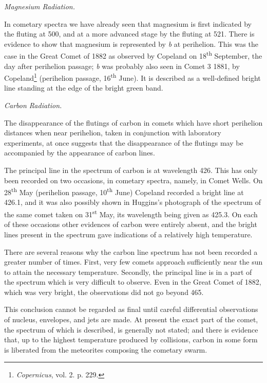 \documentclass[a4paper, 12pt, oneside, polutonikogreek, english]{article}
\begin{document}
\emph{Magnesium Radiation.}

In cometary spectra we have already seen that magnesium is first indicated by the fluting at 500, and at a more advanced stage by the fluting at 521. There is evidence to show that magnesium is represented by \emph{b} at perihelion. This was the case in the Great Comet of 1882 as observed by Copeland on 18\textsuperscript{th} September, the day after perihelion passage; \emph{b} was probably also seen in Comet 3 1881, by Copeland\footnote{\emph{Copernicus}, vol. 2. p. 229.} (perihelion passage, 16\textsuperscript{th} June). It is described as a well-defined bright line standing at the edge of the bright green band.

\emph{Carbon Radiation.}

The disappearance of the flutings of carbon in comets which have short perihelion distances when near perihelion, taken in conjunction with laboratory experiments, at once suggests that the disappearance of the flutings may be accompanied by the appearance of carbon lines.

The principal line in the spectrum of carbon is at wavelength 426. This has only been recorded on two occasions, in cometary spectra, namely, in Comet Wells. On 28\textsuperscript{th} May (perihelion passage, 10\textsuperscript{th} June) Copeland recorded a bright line at 426.1, and it was also possibly shown in Huggins's photograph of the spectrum of the same comet taken on 31\textsuperscript{st} May, its wavelength being given as 425.3. On each of these occasions other evidences of carbon were entirely absent, and the bright lines present in the spectrum gave indications of a relatively high temperature.

There are several reasons why the carbon line spectrum has not been recorded a greater number of times. First, very few comets approach sufficiently near the sun to attain the necessary temperature. Secondly, the principal line is in a part of the spectrum which is very difficult to observe. Even in the Great Comet of 1882, which was very bright, the observations did not go beyond 465.

This conclusion cannot be regarded as final until careful differential observations of nucleus, envelopes, and jets are made. At present the exact part of the comet, the spectrum of which is described, is generally not stated; and there is evidence that, up to the highest temperature produced by collisions, carbon in some form is liberated from the meteorites composing the cometary swarm.
\end{document}

